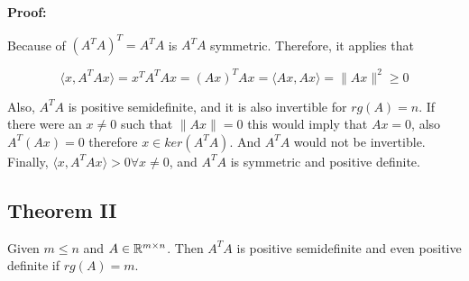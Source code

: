 \textbf{Proof:}

Because of \((A^T A)^T = A^T A\) is \(A^T A\) symmetric. Therefore, it applies that 

\[
    \langle x, A^T A x \rangle = x^T A^T A x  = (Ax)^T Ax = \langle Ax, Ax \rangle = \|Ax\|^2 \ge 0 
\]

Also, \(A^T A\) is positive semidefinite, and it is also invertible for \(rg(A) = n\). If there were an 
\(x \ne 0\) such that \(\|Ax\| = 0\) this would imply that \(Ax = 0\), also \(A^T (Ax) = 0\) therefore 
\(x \in ker(A^T A)\). And \(A^T A\) would not be invertible. Finally, 
\(\langle x, A^T Ax \rangle > 0 \forall x \ne 0\),  and \(A^T A\) is symmetric and positive definite.

\subsection{Theorem II}

Given \(m \le n\) and \(A \in \mathbb{R}^{m \times n}\). Then \(A^T A\) is positive semidefinite and even 
positive definite if \(rg(A) = m\).



